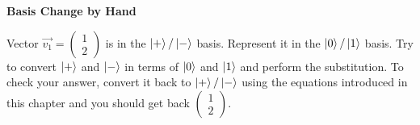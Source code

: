 \documentclass[a4paper, 10pt]{article}
\begin{document}
\begin{problem}
\textbf{Basis Change by Hand}
\par Vector \( \vec{v_1} = \begin{pmatrix}
	1 \\ 2
\end{pmatrix} \) is in the \( \ket{+}/\ket{-} \) basis.
Represent it in the \( \ket{0}/\ket{1} \) basis.
Try to convert \( \ket{+} \) and \( \ket{-} \) in terms of \( \ket{0} \) and \( \ket{1} \) and perform the substitution.
To check your answer, convert it back to \( \ket{+}/\ket{-} \) using the equations introduced in this chapter and you should get back \( \begin{pmatrix}
	1 \\ 2
\end{pmatrix} \).
\end{problem}
\end{document}
